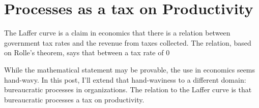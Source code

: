 
\section{Processes as a tax on Productivity}

The Laffer curve is a claim in economics that there is a relation between government tax rates and the revenue from taxes collected. The relation, based on Rolle's theorem, says that between a tax rate of 0%

While the mathematical statement may be provable, the use in economics seems hand-wavy. In this post, I'll extend that hand-waviness to a different domain: bureaucratic processes in organizations. The relation to the Laffer curve is that bureaucratic processes a tax on productivity. 